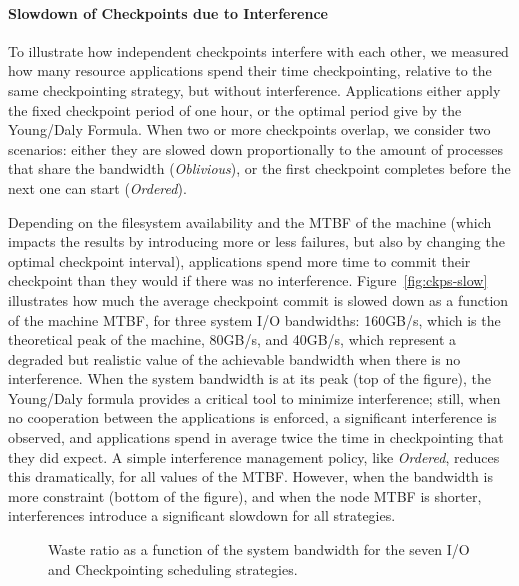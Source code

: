 \documentclass[conference,nofonttune]{IEEEtran}
\newcommand{\nocoop}{\emph{Oblivious}\xspace}
\newcommand{\fifoblock}{\emph{Ordered}\xspace}
\begin{document}
\paragraph{Slowdown of Checkpoints due to Interference}
To illustrate how independent checkpoints interfere with each other,
we measured how many resource applications spend their time
checkpointing, relative to the same checkpointing strategy, but
without interference. Applications either apply the fixed checkpoint
period of one hour, or the optimal period give by the Young/Daly
Formula. When two or more checkpoints overlap, we consider two
scenarios: either they are slowed down proportionally to the amount of
processes that share the bandwidth (\nocoop), or the first checkpoint
completes before the next one can start (\fifoblock).

Depending on the filesystem availability and the MTBF of the machine
(which impacts the results by introducing more or less failures, but
also by changing the optimal checkpoint interval), applications spend
more time to commit their checkpoint than they would if there was no
interference. Figure~\ref{fig:ckps-slow} illustrates how much
the average checkpoint commit is slowed down as a function of the
machine MTBF, for three system I/O bandwidths: 160GB/s, which is the
theoretical peak of the machine, 80GB/s, and 40GB/s, which represent a
degraded but realistic value of the achievable bandwidth when there is
no interference.  When the system bandwidth is at its peak
(top of the figure), the Young/Daly formula
provides a critical tool to minimize interference; still, when no
cooperation between the applications is enforced, a significant
interference is observed, and applications spend in average twice the
time in checkpointing that they did expect. A simple interference
management policy, like \fifoblock, reduces this dramatically, for all
values of the MTBF.  However, when the bandwidth is more constraint
(bottom of the figure), and when the node MTBF is
shorter, interferences introduce a significant slowdown for all
strategies.

\begin{figure}
  \begin{center}
    \resizebox{1.05\linewidth}{!}{}
  \end{center}
  \caption{Waste ratio as a function of the system bandwidth for the
    seven I/O and Checkpointing scheduling strategies. \label{fig:cielo-1hmtbf}}
\end{figure}
\end{document}
